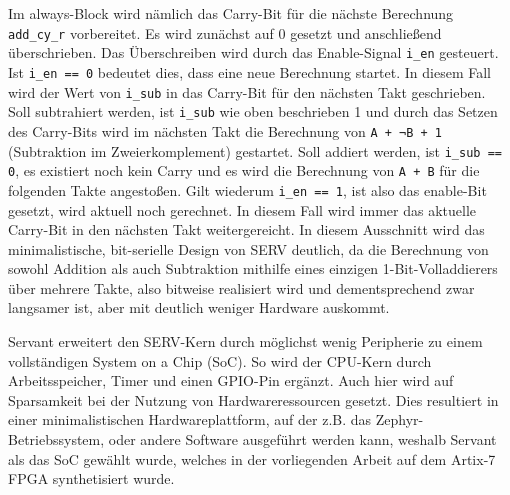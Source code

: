     Im always-Block wird nämlich das Carry-Bit für die nächste Berechnung \verb|add_cy_r| vorbereitet.
    Es wird zunächst auf 0 gesetzt und anschließend überschrieben.
    Das Überschreiben wird durch das Enable-Signal \verb|i_en| gesteuert.
    Ist \verb|i_en == 0| bedeutet dies, dass eine neue Berechnung startet.
    In diesem Fall wird der Wert von \verb|i_sub| in das Carry-Bit für den nächsten Takt geschrieben.
    Soll subtrahiert werden, ist \verb|i_sub| wie oben beschrieben 1 und durch das Setzen des Carry-Bits wird im nächsten Takt die Berechnung von \verb|A + ¬B + 1| (Subtraktion im Zweierkomplement) gestartet.
    Soll addiert werden, ist \verb|i_sub == 0|, es existiert noch kein Carry und es wird die Berechnung von \verb|A + B| für die folgenden Takte angestoßen.
    Gilt wiederum \verb|i_en == 1|, ist also das enable-Bit gesetzt, wird aktuell noch gerechnet.
    In diesem Fall wird immer das aktuelle Carry-Bit in den nächsten Takt weitergereicht.
    In diesem Ausschnitt wird das minimalistische, bit-serielle Design von SERV deutlich, da die Berechnung von sowohl Addition als auch Subtraktion mithilfe eines einzigen 1-Bit-Volladdierers über mehrere Takte, also bitweise realisiert wird und dementsprechend zwar langsamer ist, aber mit deutlich weniger Hardware auskommt.

    Servant erweitert den SERV-Kern durch möglichst wenig Peripherie zu einem vollständigen System on a Chip (SoC). So wird der CPU-Kern durch Arbeitsspeicher, Timer und einen GPIO-Pin ergänzt.
    Auch hier wird auf Sparsamkeit bei der Nutzung von Hardwareressourcen gesetzt.
    Dies resultiert in einer minimalistischen Hardwareplattform, auf der z.B. das Zephyr-Betriebssystem, oder andere Software ausgeführt werden kann, weshalb Servant als das SoC gewählt wurde, welches in der vorliegenden Arbeit auf dem Artix-7 FPGA synthetisiert wurde.

